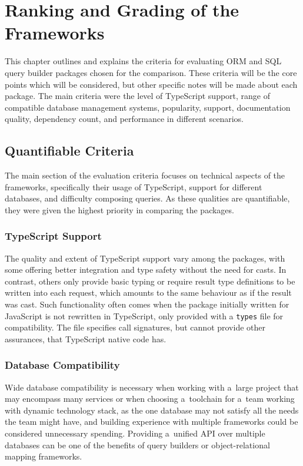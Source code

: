 \chapter{Ranking and Grading of the Frameworks}\label{ch:RankingCriteria}

This chapter outlines and explains the criteria for evaluating ORM and SQL query
builder packages chosen for the comparison. These criteria will be the core
points which will be considered, but other specific notes will be made about
each package. The main criteria were the level of TypeScript support, range of
compatible database management systems, popularity, support, documentation
quality, dependency count, and performance in different scenarios.

\section{Quantifiable Criteria}

The main section of the evaluation criteria focuses on technical aspects of the
frameworks, specifically their usage of TypeScript, support for different
databases, and difficulty composing queries. As these qualities are
quantifiable, they were given the highest priority in comparing the packages.

\subsection{TypeScript Support}

The quality and extent of TypeScript support vary among the packages, with some
offering better integration and type safety without the need for casts. In
contrast, others only provide basic typing or require result type definitions to
be written into each request, which amounts to the same behaviour as if the
result was cast. Such functionality often comes when the package initially
written for JavaScript is not rewritten in TypeScript, only provided with a
\texttt{types} file for compatibility. The file specifies call signatures, but
cannot provide other assurances, that TypeScript native code has.

\subsection{Database Compatibility}

Wide database compatibility is necessary when working with a~large project that
may encompass many services or when choosing a~toolchain for a~team working with
dynamic technology stack, as the one database may not satisfy all the needs the
team might have, and building experience with multiple frameworks could be
considered unnecessary spending. Providing a~unified API over multiple databases
can be one of the benefits of query builders or object-relational mapping
frameworks.

